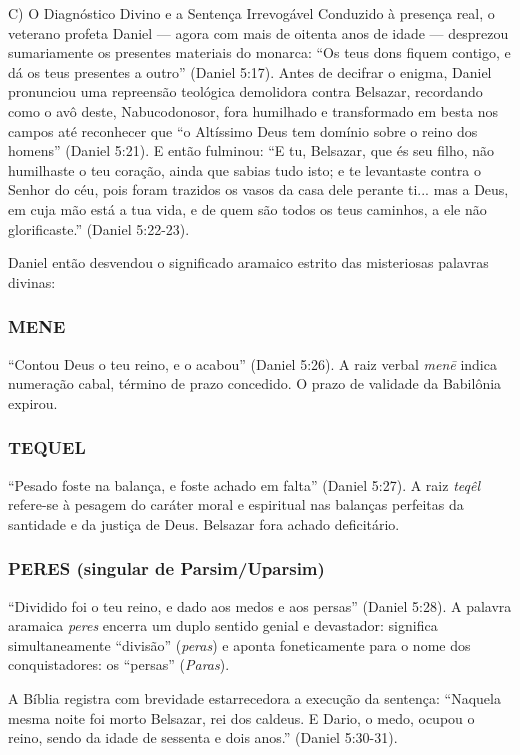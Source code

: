 \documentclass[11pt,a4paper,openany]{book}
\begin{document}
C) O Diagnóstico Divino e a Sentença Irrevogável
Conduzido à presença real, o veterano profeta Daniel — agora com mais de oitenta anos de idade — desprezou sumariamente os presentes materiais do monarca: ``Os teus dons fiquem contigo, e dá os teus presentes a outro'' (Daniel 5:17). Antes de decifrar o enigma, Daniel pronunciou uma repreensão teológica demolidora contra Belsazar, recordando como o avô deste, Nabucodonosor, fora humilhado e transformado em besta nos campos até reconhecer que ``o Altíssimo Deus tem domínio sobre o reino dos homens'' (Daniel 5:21). E então fulminou:
``E tu, Belsazar, que és seu filho, não humilhaste o teu coração, ainda que sabias tudo isto; e te levantaste contra o Senhor do céu, pois foram trazidos os vasos da casa dele perante ti... mas a Deus, em cuja mão está a tua vida, e de quem são todos os teus caminhos, a ele não glorificaste.'' (Daniel 5:22-23).

Daniel então desvendou o significado aramaico estrito das misteriosas palavras divinas:

\subsubsection*{MENE}
``Contou Deus o teu reino, e o acabou'' (Daniel 5:26). A raiz verbal \textit{menē} indica numeração cabal, término de prazo concedido. O prazo de validade da Babilônia expirou.

\subsubsection*{TEQUEL}
``Pesado foste na balança, e foste achado em falta'' (Daniel 5:27). A raiz \textit{teqêl} refere-se à pesagem do caráter moral e espiritual nas balanças perfeitas da santidade e da justiça de Deus. Belsazar fora achado deficitário.

\subsubsection*{PERES (singular de Parsim/Uparsim)}
``Dividido foi o teu reino, e dado aos medos e aos persas'' (Daniel 5:28). A palavra aramaica \textit{peres} encerra um duplo sentido genial e devastador: significa simultaneamente ``divisão'' (\textit{peras}) e aponta foneticamente para o nome dos conquistadores: os ``persas'' (\textit{Paras}).

A Bíblia registra com brevidade estarrecedora a execução da sentença:
``Naquela mesma noite foi morto Belsazar, rei dos caldeus. E Dario, o medo, ocupou o reino, sendo da idade de sessenta e dois anos.'' (Daniel 5:30-31).
\end{document}
